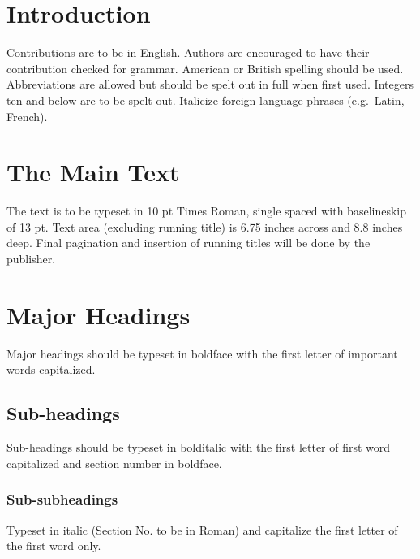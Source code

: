 \documentclass[11pt,twoside]{article}
\begin{document}
\vspace*{10pt}\textlineskip
\begin{multicols}{2}

\section{Introduction}
Contributions are to be in English. Authors are encouraged to
have their contribution checked for grammar. American or British
spelling should be used. Abbreviations are allowed but should be
spelt out in full when first used. Integers ten and below are to
be spelt out. Italicize foreign language phrases (e.g.~Latin,
French).

\section{The Main Text}
The text is to be typeset in 10 pt Times Roman, single spaced with
baselineskip of 13 pt. Text area (excluding running title) is 6.75
inches across and 8.8 inches deep. Final pagination and insertion of
running titles will be done by the publisher.

\section{Major Headings}
Major headings should be typeset in boldface with the first
letter of important words capitalized.

\subsection{Sub-headings}
Sub-headings should be typeset in bolditalic with the first
letter of first word capitalized and section number in boldface.

\subsubsection{Sub-subheadings}

Typeset in italic (Section No. to be in Roman) and capitalize
the first letter of the first word only.


\end{multicols}
\end{document}
